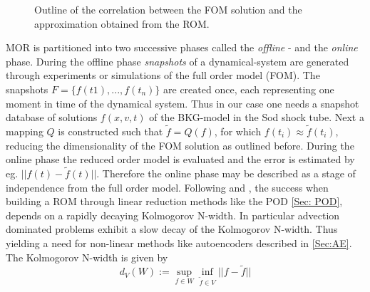 \begin{figure}[H]
	\begin{subfigure}{.45\textwidth}
		\centering
		
	\end{subfigure}\hfill
	\begin{subfigure}{.45\textwidth}
		\centering
		
	\end{subfigure}
	\caption{Outline of the correlation between the FOM solution and the approximation obtained from the ROM.}
\end{figure}
MOR is partitioned into two successive phases called the \textit{offline} - and the \textit{online} phase. During the offline phase \textit{snapshots} of a dynamical-system are generated through experiments or simulations of the full order model (FOM). The snapshots \(F = \{f(t1),...,f(t_n)\}\) are created once, each representing one moment in time of the dynamical system. Thus in our case one needs a snapshot database of solutions \(f(x,v,t)\) of the BKG-model in the Sod shock tube. Next a mapping \(Q\) is constructed such that \(\tilde{f} = Q(f)\), for which \(f(t_i) \approx \tilde{f}(t_i)\), reducing the dimensionality of the FOM solution as outlined before. During the online phase the reduced order model is evaluated and the error is estimated by eg. \(||f(t) - \tilde{f}(t)||\). Therefore the online phase may be described as a stage of independence from the full order model.
Following \cite{ohlberger2015reduced} and \cite{Carlberg}, the success when building a ROM through linear reduction methods like the POD \cref{Sec: POD}, depends on a rapidly decaying Kolmogorov N-width. In particular advection dominated problems exhibit a slow decay of the Kolmogorov N-width. Thus yielding a need for non-linear methods like autoencoders described in \cref{Sec:AE}. The Kolmogorov N-width is given by
\begin{equation}
	d_{V}(W):= \sup_{f \in W} \inf_{\tilde{f} \in V} ||f-\tilde{f}||
\end{equation}
